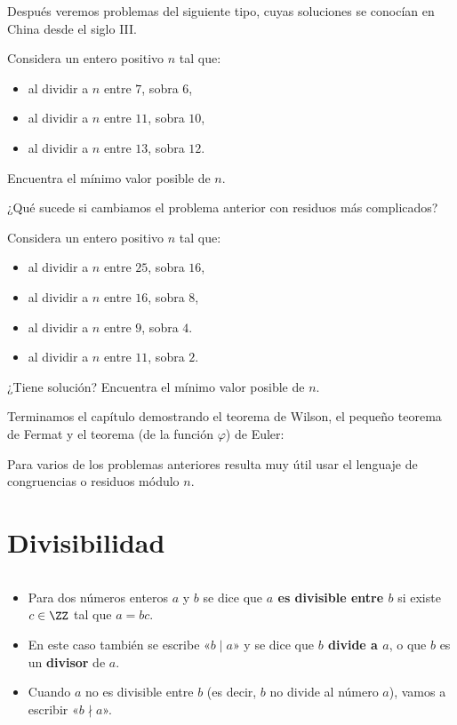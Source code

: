 Después veremos problemas del siguiente tipo, cuyas soluciones se conocían en China desde el siglo III.

\begin{ejercicio}
Considera un entero positivo $n$ tal que:  
\begin{itemize}
\item al dividir a $n$ entre $7$, sobra $6$,
\item al dividir a $n$ entre $11$, sobra $10$,
\item al dividir a $n$ entre $13$, sobra $12$.
\end{itemize}

Encuentra el mínimo valor posible de $n$.
\end{ejercicio}

¿Qué sucede si cambiamos el problema anterior con residuos más complicados? 

\begin{ejercicio}
Considera un entero positivo $n$ tal que:  
\begin{itemize}
\item al dividir a $n$ entre $25$, sobra $16$,
\item al dividir a $n$ entre $16$, sobra $8$,
\item al dividir a $n$ entre $9$, sobra $4$.
\item al dividir a $n$ entre $11$, sobra $2$.
\end{itemize}
¿Tiene solución?
Encuentra el mínimo valor posible de $n$.
\end{ejercicio}

Terminamos el capítulo demostrando el teorema de Wilson, el pequeño teorema de Fermat y el teorema (de la función $\varphi$) de Euler:

Para varios de los problemas anteriores resulta muy útil usar el lenguaje de congruencias o residuos módulo $n$. 

\section{Divisibilidad}
\begin{definicion}
$~$
\begin{itemize}
    \item   Para dos números enteros $a$ y $b$ se dice que
  \textbf{$a$ es divisible entre $b$} si existe $c \in \ZZ$ tal que $a = bc$.
    \item  En
  este caso también se escribe «$b \mid a$» y se dice que
  \textbf{$b$ divide a $a$}, o que $b$ es un \textbf{divisor} de $a$.
    \item   Cuando $a$ no es divisible entre $b$ (es decir, $b$ no divide al número $a$),
  vamos a escribir «$b \nmid a$».
\end{itemize}
\end{definicion}

